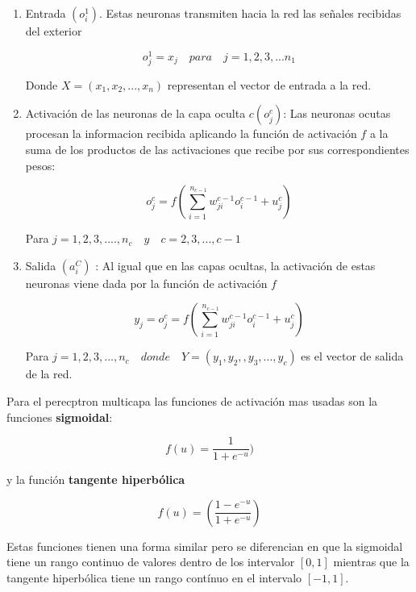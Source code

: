 \documentclass[12pt]{article}
\begin{document}
\begin{enumerate}
\item 
Entrada $(o_i^1)$. Estas neuronas transmiten hacia la red las señales recibidas del exterior

\begin{equation} \label{eq4}
o_j^1 = x_j \quad para \quad j=1,2,3,...n_1
\end{equation}

Donde  $X = (x_1,x_2,...,x_n)$ representan el vector de entrada a la red.

\item
Activación de las neuronas de  la capa oculta $c (o_j^c)$: Las neuronas ocutas procesan la informacion recibida aplicando la función de activación $f$ a la suma de los productos de las activaciones que recibe por sus correspondientes pesos:


\begin{equation} \label{eq5}
o_j^c = f(\sum_{i=1}^{\ n_{c-1}} w_{ji}^{c-1}o_i^{c-1} + u_j^c)
\end{equation}

Para $j = 1,2,3,....,n_c \quad y \quad c=2,3,...,c-1$

\item
Salida $(a_i^C)$ : Al igual que en las capas ocultas, la activación de estas neuronas viene dada por la función de activación $f$

\begin{equation} \label{eq6}
y_j = o_j^c = f(\sum_{i=1}^{\ n_{c-1}} w_{ji}^{c-1}o_i^{c-1} + u_j^c)
\end{equation}

Para $j=1,2,3,...,n_c \quad donde \quad Y=(y_1,y_2,,y_3,...,y_c)$ es el vector de salida de la red.

\end{enumerate}

Para el perecptron multicapa las funciones de activación mas usadas son la funciones \textbf{sigmoidal}:

\begin{equation} \label{eq7}
f(u) = \frac{1}{1+e^{-u}})
\end{equation}

y la función \textbf{tangente hiperbólica}

\begin{equation} \label{eq8}
f(u) = ( \frac{1 - e^{-u}}{1 + e^{-u}}) 
\end{equation}

Estas funciones tienen una forma similar pero se diferencian en que la sigmoidal tiene un rango continuo de valores dentro de los intervalor $[0,1]$ mientras que la tangente hiperbólica tiene un rango contínuo en el intervalo $[-1,1]$.
\end{document}
